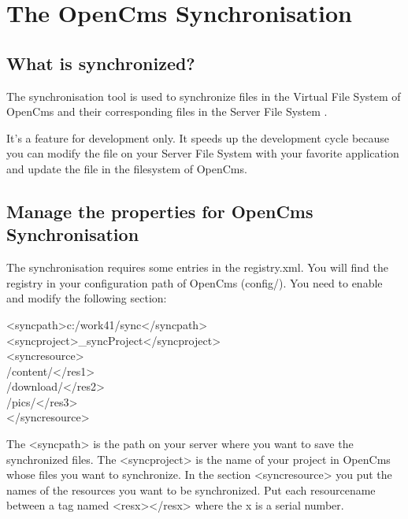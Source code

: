 \section{The OpenCms Synchronisation}
\label{synchronisation}

\subsection{What is synchronized?}
The synchronisation tool  is used to synchronize  files in the Virtual File System  of OpenCms and their corresponding files in the Server File System .

It's a feature for development only. It speeds up the development cycle because you can modify the file on your Server File System with your favorite application and update the file in the filesystem of OpenCms.

\subsection{Manage the properties for OpenCms Synchronisation}
The synchronisation requires some entries in the {\dir
registry.xml}. You will find the registry in your configuration
path of OpenCms ({\dir config/}). You need to enable and modify
the following section:

\begin{xml}
<syncpath>c:/work41/sync</syncpath>\\
<syncproject>\_syncProject</syncproject>\\
<syncresource>\\
/content/</res1>\\
/download/</res2>\\
/pics/</res3>\\
</syncresource>\\
\end{xml}

The {\tag <syncpath>}  is the path on your server
where you want to save the synchronized files. The {\tag
<syncproject>}  is the name of your project in
OpenCms whose files you want to synchronize. In the section {\tag
<syncresource>}  you put the names of the
resources you want to be synchronized. Put each resourcename
between a tag named {\tag <resx></resx>} where the {\name x} is a
serial number.

